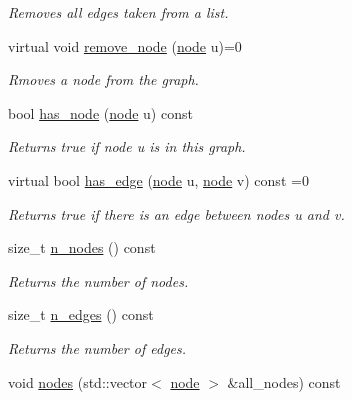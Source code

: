 \begin{DoxyCompactItemize}
\begin{DoxyCompactList}\small\item\em Removes all edges taken from a list. \end{DoxyCompactList}\item 
virtual void \hyperlink{classlgraph_1_1xxgraph_a5b9e033f38a3ab34734be61aa9344c84}{remove\-\_\-node} (\hyperlink{namespacelgraph_a397169dd66adf725210a30fb7251773e}{node} u)=0
\begin{DoxyCompactList}\small\item\em Rmoves a node from the graph. \end{DoxyCompactList}\item 
\hypertarget{classlgraph_1_1xxgraph_ac2ff3b6ec8da7c5b61d1c84215eed680}{bool \hyperlink{classlgraph_1_1xxgraph_ac2ff3b6ec8da7c5b61d1c84215eed680}{has\-\_\-node} (\hyperlink{namespacelgraph_a397169dd66adf725210a30fb7251773e}{node} u) const }\label{classlgraph_1_1xxgraph_ac2ff3b6ec8da7c5b61d1c84215eed680}

\begin{DoxyCompactList}\small\item\em Returns true if node {\itshape u} is in this graph. \end{DoxyCompactList}\item 
virtual bool \hyperlink{classlgraph_1_1xxgraph_a4e36e9722df020df6ba1dc47b7d9d830}{has\-\_\-edge} (\hyperlink{namespacelgraph_a397169dd66adf725210a30fb7251773e}{node} u, \hyperlink{namespacelgraph_a397169dd66adf725210a30fb7251773e}{node} v) const =0
\begin{DoxyCompactList}\small\item\em Returns true if there is an edge between nodes {\itshape u} and {\itshape v}. \end{DoxyCompactList}\item 
size\-\_\-t \hyperlink{classlgraph_1_1xxgraph_a879c8fc141a2d7847ec4e192e3b415f5}{n\-\_\-nodes} () const 
\begin{DoxyCompactList}\small\item\em Returns the number of nodes. \end{DoxyCompactList}\item 
size\-\_\-t \hyperlink{classlgraph_1_1xxgraph_a8ca991d1521cb6ba77e1cd3494ab42be}{n\-\_\-edges} () const 
\begin{DoxyCompactList}\small\item\em Returns the number of edges. \end{DoxyCompactList}\item 
\hypertarget{classlgraph_1_1xxgraph_a27086830e76e7cf847ba0bc3c26fb0ee}{void \hyperlink{classlgraph_1_1xxgraph_a27086830e76e7cf847ba0bc3c26fb0ee}{nodes} (std\-::vector$<$ \hyperlink{namespacelgraph_a397169dd66adf725210a30fb7251773e}{node} $>$ \&all\-\_\-nodes) const }\label{classlgraph_1_1xxgraph_a27086830e76e7cf847ba0bc3c26fb0ee}


\end{DoxyCompactItemize}
